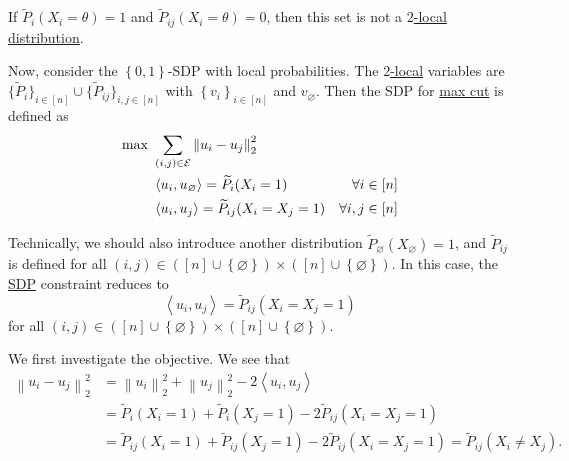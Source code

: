 \begin{eg}
	If \(\widetilde{P} _i (X_i = \theta ) = 1\) and \(\widetilde{P} _{ij}(X_i = \theta ) = 0\), then this set is not a \hyperref[def:2-local-distribution]{\(2\)-local distribution}.
\end{eg}

Now, consider the \(\left\{ 0, 1 \right\} \)-SDP with local probabilities. The \hyperref[def:2-local-distribution]{\(2\)-local} variables are \(\{ \widetilde{P} _i \} _{i\in [n]} \cup  \{ \widetilde{P} _{ij} \}_{i, j\in [n]} \) with \(\left\{ v_i \right\} _{i\in [n]}\) and \(v_\varnothing \). Then the SDP for \hyperref[prb:max-cut]{max cut} is defined as
\[
	\begin{aligned}
		\max~ & \sum_{(i, j)\in \mathcal{\MakeUppercase{e}} }\left\lVert u_i - u_j\right\rVert _2^2                       \\
		      & \left\langle u_i, u_\varnothing  \right\rangle = \widetilde{P} _i(X_i = 1)          & \forall i\in [n]    \\
		      & \left\langle u_i, u_j  \right\rangle = \widetilde{P} _{ij}(X_i = X_j = 1)           & \forall i, j\in [n] \\
	\end{aligned}
\]

\begin{remark}
	Technically, we should also introduce another distribution \(\widetilde{P} _{\varnothing }(X_\varnothing) = 1\), and \(\widetilde{P} _{ij}\) is defined for all \((i, j)\in ([n]\cup \left\{ \varnothing  \right\} )\times ([n]\cup \left\{ \varnothing  \right\} )\). In this case, the \hyperref[def:SDP]{SDP} constraint reduces to
	\[
		\left\langle  u_i, u_j \right\rangle = \widetilde{P} _{ij}(X_{i} = X_{j} =1)
	\]
	for all \((i, j)\in ([n]\cup \left\{ \varnothing  \right\} )\times ([n]\cup \left\{ \varnothing \right\} )\).
\end{remark}

We first investigate the objective. We see that
\[
	\begin{split}
		\left\lVert u_i - u_j\right\rVert _2^2
		&= \left\lVert u_i\right\rVert _2^2 + \left\lVert u_j\right\rVert _2^2 - 2\left\langle u_{i} , u_{j}  \right\rangle \\
		&= \widetilde{P} _i(X_i = 1)+ \widetilde{P} _i(X_j = 1) - 2 \widetilde{P} _{ij} ( X_i = X_j = 1)\\
		&= \widetilde{P} _{ij}(X_i = 1)+ \widetilde{P} _{ij}(X_j = 1) - 2 \widetilde{P} _{ij} ( X_i = X_j = 1)
		= \widetilde{P} _{ij} ( X_i \neq X_j).
	\end{split}
\]

